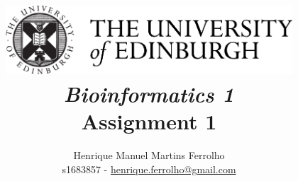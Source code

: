\title{
    \includegraphics[width=0.8\textwidth]{res/university-of-edinburgh-logo.png}\\
    \bigskip\bigskip
    \bigskip\bigskip
    \bigskip\bigskip
    \huge{\textbf{\textit{Bioinformatics 1}}}\\
    \bigskip\bigskip
    \bigskip\bigskip
    \large\textbf{Assignment 1}\\
    \bigskip\bigskip
    \bigskip\bigskip
    \bigskip\bigskip
    \bigskip\bigskip
    \bigskip\bigskip
    \bigskip\bigskip
}

\author{
    Henrique Manuel Martins Ferrolho\\
    s1683857 - \href{mailto:henrique.ferrolho@gmail.com}{henrique.ferrolho@gmail.com}
    \bigskip
}

\maketitle
\thispagestyle{empty}

\newpage
